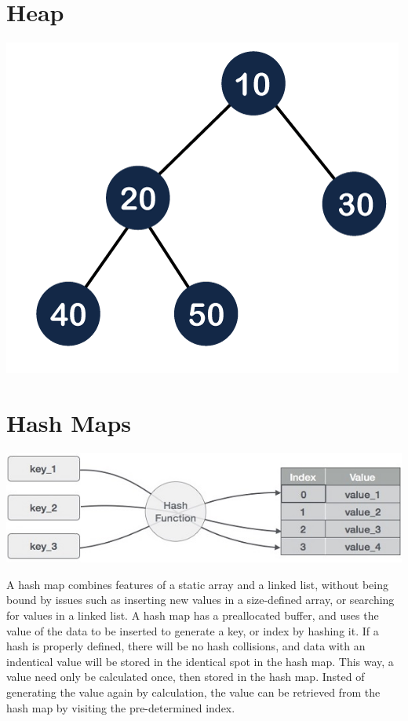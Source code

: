 \documentclass[11pt]{article}
\begin{document}
\section{Heap}
\begin{center}
    \includegraphics[width=200 px]{img/heap}  \\
\end{center}
\section{Hash Maps}
\begin{center}
    \includegraphics[width=300 px]{img/hash}  \\
\end{center}

A hash map combines features of a static array and a linked list, without being bound by issues such as inserting new values in a size-defined array, or searching for values in a linked list. A hash map has a preallocated buffer, and uses the value of the data to be inserted to generate a key, or index by hashing it. If a hash is properly defined, there will be no hash collisions, and data with an indentical value will be stored in the identical spot in the hash map. This way, a value need only be calculated once, then stored in the hash map. Insted of generating the value again by calculation, the value can be retrieved from the hash map by visiting the pre-determined index.
\end{document}
